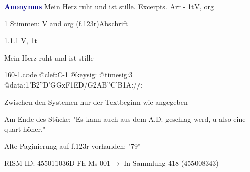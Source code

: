 \documentclass[twocolumn, 12pt]{book}
\begin{document}
\par \vspace{16pt} \textcolor{darkblue}{\textbf{Anonymus  }}\hfillplus{\textbf{[160]}}\newline Mein Herz ruht und ist stille. Excerpts. Arr - 1t\newline V, org
\par \begin{itshape}\end{itshape} 
\par \textcolor{darkblue}{}  1 Stimmen: V and org  (f.123r)\newline Abschrift
\par 1.1.1  V, 1t\newline \begin{footnotesize} Mein Herz ruht und ist stille \end{footnotesize}  
\begin{filecontents*}{160-1.code}
@clef:C-1
@keysig:
@timesig:3
@data:1'B2''D'GGxF1ED/G2AB''C'B1A://:
\end{filecontents*}
\newline %
\par Zwischen den Systemen nur der Textbeginn wie angegeben
\par Am Ende des Stücke: "Es kann auch aus dem A.D. geschlag werd, u also eine quart höher."
\par Alte Paginierung auf f.123r vorhanden: "79"
\par RISM-ID: 455011036\newline D-Fh  Ms 001\newline $\rightarrow$ In Sammlung 418 (455008343)
      
\end{document}
